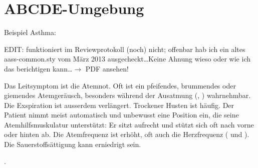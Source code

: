 \documentclass[
ngerman,
paper=a4,
asymmetric,
fontsize=10pt,
draft=false,
numbers=noenddot,
bibtotocnumbered,
footnotes=multiple,
]{scrreprt}
\newcommand{\jALT}{\vspace{6pt}\noindent{\color{red}\sffamily\textbf{DELETED}\hrulefill\newline}}
\newcommand{\jALTende}{\newline{\color{red}\rule{\linewidth}{2pt}\newline}}
\begin{document}
\section{ABCDE-Umgebung}

Beispiel Asthma:

EDIT: funktioniert im Reviewprotokoll (noch) nicht; offenbar hab ich ein
altes aass-common.sty vom März 2013 ausgecheckt\ldots Keine Ahnung wieso
oder wie ich das berichtigen kann\ldots $\to$ PDF ansehen!

\jALT
\TextSlide{\TxSymptome}
{%
Das Leitsymptom ist die Atemnot. Oft ist ein pfeifendes,
brummendes oder giemendes Atemgeräusch, besonders während
der Ausatmung (, ) wahrnehmbar. Die Exspiration ist ausserdem
verlängert. Trockener Husten ist häufig.
Der Patient nimmt meist automatisch und unbewusst eine
Position ein, die seine Atemhilfsmuskulatur unterstützt: Er
sitzt aufrecht und stützt sich oft nach vorne oder hinten
ab.
Die Atemfrequenz ist erhöht, oft auch die Herzfrequenz
( und ). Die Sauerstoffsättigung
kann erniedrigt sein.

}{}{}{}{}.
\jALTende
\end{document}
